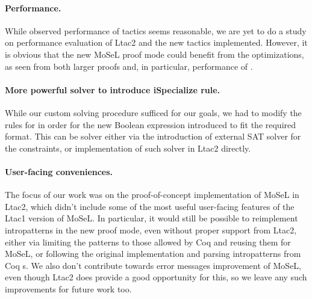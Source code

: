 \paragraph{Performance.}
  While observed performance of tactics seems reasonable, we are yet to do a study on performance evaluation of Ltac2 and the new tactics implemented.
  However, it is obvious that the new MoSeL proof mode could benefit from the optimizations, as seen from both larger proofs and, in particular, performance of .
\paragraph{More powerful solver to introduce iSpecialize rule.}
  While our custom solving procedure sufficed for our goals, we had to modify the rules for  in order for the new Boolean expression introduced to fit the required format.
  This can be solver either via the introduction of external SAT solver for the constraints, or implementation of such solver in Ltac2 directly.
\paragraph{User-facing conveniences.}
  The focus of our work was on the proof-of-concept implementation of MoSeL in Ltac2, which didn't include some of the most useful user-facing features of the Ltac1 version of MoSeL.
  In particular, it would still be possible to reimplement intropatterns in the new proof mode, even without proper support from Ltac2, either via limiting the patterns to those allowed by Coq and reusing them for MoSeL, or following the original implementation and parsing intropatterns from Coq s.
  We also don't contribute towards error messages improvement of MoSeL, even though Ltac2 does provide a good opportunity for this, so we leave any such improvements for future work too.

